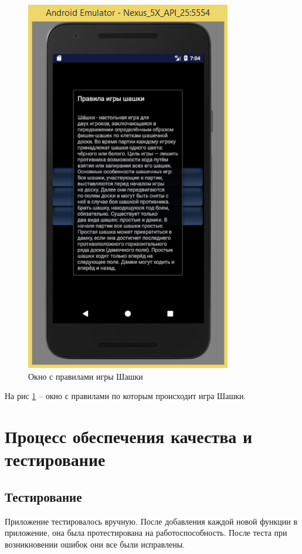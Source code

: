 \documentclass[a4paper]{article}
\begin{document}
\begin{figure}[H]
	\begin{center}
		\includegraphics[scale=0.5]{about}
		\caption{Окно с правилами игры Шашки} 
		\label{pic:about} %
	\end{center}
\end{figure}

На рис \ref{pic:about} – окно с правилами по которым происходит игра Шашки.


\section{Процесс обеспечения качества и тестирование}
\subsection{Тестирование}
Приложение тестировалось вручную. После добавления каждой новой функции в приложение, она была протестирована на работоспособность. После теста при возникновении ошибок они все были исправлены.
\end{document}

